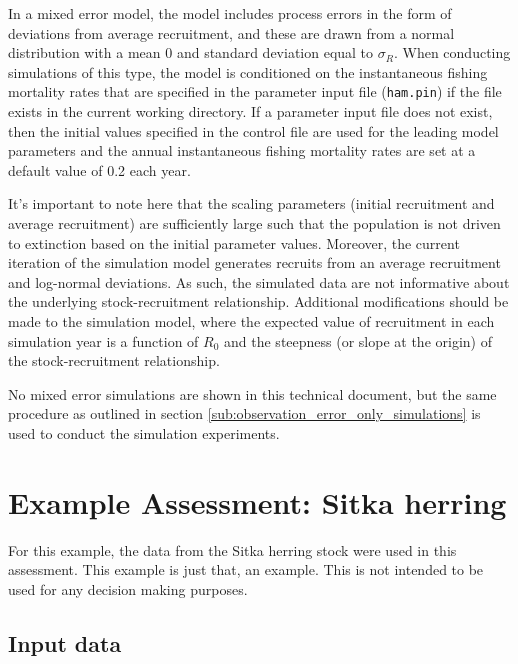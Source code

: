 \documentclass[12pt,letterpaper]{article}
\begin{document}
  In a mixed error model, the model includes process errors in the form of deviations from average recruitment, and these are drawn from a normal distribution with a mean 0 and standard deviation equal to $\sigma_R$.  When conducting simulations of this type, the model is conditioned on the instantaneous fishing mortality rates that are specified in the parameter input file (\texttt{ham.pin}) if the file exists in the current working directory. If a parameter input file does not exist, then the initial values specified in the control file are used for the leading model parameters and the annual instantaneous fishing mortality rates are set at a default value of 0.2 each year.

  It's important to note here that the scaling parameters (initial recruitment and average recruitment) are sufficiently large such that the population is not driven to extinction based on the initial parameter values.  Moreover, the current iteration of the simulation model generates recruits from an average recruitment and log-normal deviations.  As such, the simulated data are not informative about the underlying stock-recruitment relationship.  Additional modifications should be made to the simulation model, where the expected value of recruitment in each simulation year is a function of $R_0$ and the steepness (or slope at the origin) of the stock-recruitment relationship.

  No mixed error simulations are shown in this technical document, but the same procedure as outlined in section \ref{sub:observation_error_only_simulations} is used to conduct the simulation experiments.






  \section{Example Assessment: Sitka herring} %
  \label{sec:example_assessment_sitka_herring}
  
  For this example, the data from the Sitka herring stock were used in this assessment.  This example is just that, an example. This is not intended to be used for any decision making purposes.


  \subsection{Input data} %
  \label{sub:input_data}
  
\end{document}
